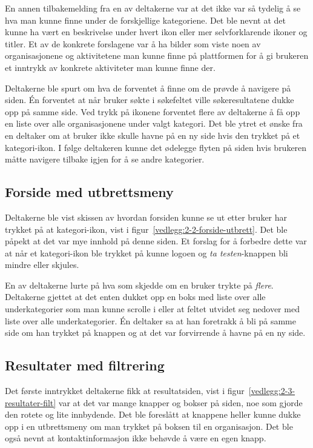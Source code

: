 En annen tilbakemelding fra en av deltakerne var at det ikke var så tydelig å se hva man kunne finne under de forskjellige kategoriene. Det ble nevnt at det kunne ha vært en beskrivelse under hvert ikon eller mer selvforklarende ikoner og titler. Et av de konkrete forslagene var å ha bilder som viste noen av organisasjonene og aktivitetene man kunne finne på plattformen for å gi brukeren et inntrykk av konkrete aktiviteter man kunne finne der.

Deltakerne ble spurt om hva de forventet å finne om de prøvde å navigere på siden. Én forventet at når bruker søkte i søkefeltet ville søkeresultatene dukke opp på samme side. Ved trykk på ikonene forventet flere av deltakerne å få opp en liste over alle organisasjonene under valgt kategori. Det ble ytret et ønske fra en deltaker om at bruker ikke skulle havne på en ny side hvis den trykket på et kategori-ikon. I følge deltakeren kunne det ødelegge flyten på siden hvis brukeren måtte navigere tilbake igjen for å se andre kategorier.


\subsection{Forside med utbrettsmeny}

Deltakerne ble vist skissen av hvordan forsiden kunne se ut etter bruker har trykket på at kategori-ikon, vist i figur~\ref{vedlegg:2-2-forside-utbrett}. Det ble påpekt at det var mye innhold på denne siden. Et forslag for å forbedre dette var at når et kategori-ikon ble trykket på kunne logoen og {\em ta testen}-knappen bli mindre eller skjules. 

En av deltakerne lurte på hva som skjedde om en bruker trykte på {\em flere}. Deltakerne gjettet at det enten dukket opp en boks med liste over alle underkategorier som man kunne scrolle i eller at feltet utvidet seg nedover med liste over alle underkategorier. Én deltaker sa at han foretrakk å bli på samme side om han trykket på knappen og at det var forvirrende å havne på en ny side.


\subsection{Resultater med filtrering}
\label{section:test-resultater-2.0}

Det første inntrykket deltakerne fikk at resultatsiden, vist i figur~\ref{vedlegg:2-3-resultater-filt} var at det var mange knapper og bokser på siden, noe som gjorde den rotete og lite innbydende. Det ble foreslått at knappene heller kunne dukke opp i en utbrettsmeny om man trykket på boksen til en organisasjon. Det ble også nevnt at kontaktinformasjon ikke behøvde å være en egen knapp.

